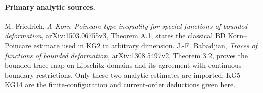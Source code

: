 \paragraph{Primary analytic sources.}
M. Friedrich, \emph{A Korn--Poincare-type inequality for special
functions of bounded deformation}, arXiv:1503.06755v3,
Theorem A.1, states the classical \(\mathrm{BD}\)
Korn--Poincare estimate used in KG2 in arbitrary dimension.
J.-F. Babadjian, \emph{Traces of functions of bounded deformation},
arXiv:1308.5497v2, Theorem 3.2, proves the bounded trace map
on Lipschitz domains and its agreement with continuous
boundary restrictions.  Only these two analytic estimates
are imported; KG5--KG14 are the finite-configuration and
current-order deductions given here.
